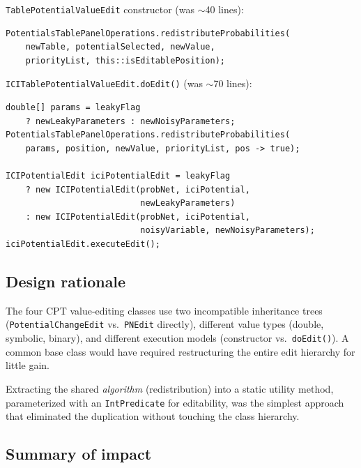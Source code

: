 \documentclass[12pt,a4paper]{article}
\newcommand{\code}[1]{\texttt{#1}}
\newcommand{\cls}[1]{\texttt{#1}}
\newcommand{\meth}[1]{\texttt{#1}}
\begin{document}
\cls{TablePotentialValueEdit} constructor (was $\sim$40 lines):

\begin{lstlisting}[caption={TablePotentialValueEdit --- after R5}]
PotentialsTablePanelOperations.redistributeProbabilities(
    newTable, potentialSelected, newValue,
    priorityList, this::isEditablePosition);
\end{lstlisting}

\cls{ICITablePotentialValueEdit.doEdit()} (was $\sim$70 lines):

\begin{lstlisting}[caption={ICITablePotentialValueEdit.doEdit() --- after R5}]
double[] params = leakyFlag
    ? newLeakyParameters : newNoisyParameters;
PotentialsTablePanelOperations.redistributeProbabilities(
    params, position, newValue, priorityList, pos -> true);

ICIPotentialEdit iciPotentialEdit = leakyFlag
    ? new ICIPotentialEdit(probNet, iciPotential,
                           newLeakyParameters)
    : new ICIPotentialEdit(probNet, iciPotential,
                           noisyVariable, newNoisyParameters);
iciPotentialEdit.executeEdit();
\end{lstlisting}

\subsection{Design rationale}

The four CPT value-editing classes use two incompatible inheritance
trees (\cls{PotentialChangeEdit} vs.\ \cls{PNEdit} directly), different
value types (double, symbolic, binary), and different execution models
(constructor vs.\ \meth{doEdit()}). A common base class would have
required restructuring the entire edit hierarchy for little gain.

Extracting the shared \emph{algorithm} (redistribution) into a static
utility method, parameterized with an \code{IntPredicate} for
editability, was the simplest approach that eliminated the duplication
without touching the class hierarchy.

\subsection{Summary of impact}
\end{document}
